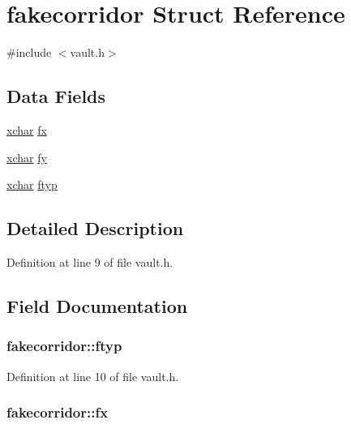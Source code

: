 \hypertarget{structfakecorridor}{\section{fakecorridor Struct Reference}
\label{structfakecorridor}
}


{\ttfamily \#include $<$vault.\+h$>$}

\subsection*{Data Fields}
\begin{DoxyCompactItemize}
\item 
\hyperlink{global_8h_a2043b7d01ce89f4ee2fa6c345a752d32}{xchar} \hyperlink{structfakecorridor_a752aceb71e5acd821fdd250542f28ae1}{fx}
\item 
\hyperlink{global_8h_a2043b7d01ce89f4ee2fa6c345a752d32}{xchar} \hyperlink{structfakecorridor_a03e2a0a63c72ecdad67272a261526020}{fy}
\item 
\hyperlink{global_8h_a2043b7d01ce89f4ee2fa6c345a752d32}{xchar} \hyperlink{structfakecorridor_abebf9ae52b95e83689ff237b7441d026}{ftyp}
\end{DoxyCompactItemize}


\subsection{Detailed Description}


Definition at line 9 of file vault.\+h.



\subsection{Field Documentation}
\hypertarget{structfakecorridor_abebf9ae52b95e83689ff237b7441d026}{
\subsubsection[{ftyp}]{ fakecorridor\+::ftyp}}\label{structfakecorridor_abebf9ae52b95e83689ff237b7441d026}


Definition at line 10 of file vault.\+h.

\hypertarget{structfakecorridor_a752aceb71e5acd821fdd250542f28ae1}{
\subsubsection[{fx}]{ fakecorridor\+::fx}}\label{structfakecorridor_a752aceb71e5acd821fdd250542f28ae1}


